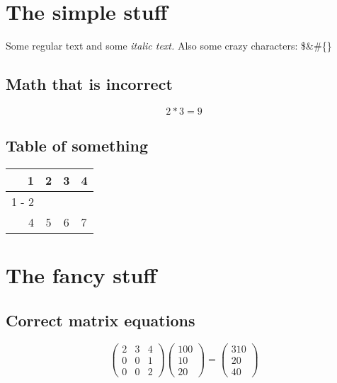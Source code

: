\documentclass{article}%
\begin{document}
%
\normalsize%
\section{The simple stuff}%
\label{sec:Thesimplestuff}%
Some regular text and some%
\textit{italic text. }%
\newline%
Also some crazy characters: \$\&\#\{\}%
\subsection{Math that is incorrect}%
\label{subsec:Maththatisincorrect}%
\[%
2*3 = 9%
\]

%
\subsection{Table of something}%
\label{subsec:Tableofsomething}%
\begin{tabular}{rc|cl}%
\hline%
1&2&3&4\\%
\cline{1%
-%
2}%
&&&\\%
4&5&6&7\\%
\end{tabular}

%
\section{The fancy stuff}%
\label{sec:Thefancystuff}%
\subsection{Correct matrix equations}%
\label{subsec:Correctmatrixequations}%
\[%
\begin{pmatrix}%
2&3&4\\%
0&0&1\\%
0&0&2%
\end{pmatrix} \begin{pmatrix}%
100\\%
10\\%
20%
\end{pmatrix} = \begin{pmatrix}%
310\\%
20\\%
40%
\end{pmatrix}%
\]

%
\end{document}
